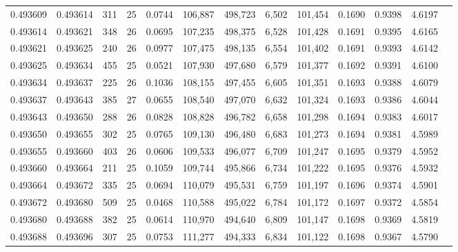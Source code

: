 \begin{tabular}{rrrrrrrrrrrrr}
0.493609 & 0.493614 & 311 &  25 &                                     0.0744 & 106,887 & 498,723 &   6,502 & 101,454 & 0.1690 & 0.9398 & 4.6197 \\
0.493614 & 0.493621 & 348 &  26 &                                     0.0695 & 107,235 & 498,375 &   6,528 & 101,428 & 0.1691 & 0.9395 & 4.6165 \\
0.493621 & 0.493625 & 240 &  26 &                                     0.0977 & 107,475 & 498,135 &   6,554 & 101,402 & 0.1691 & 0.9393 & 4.6142 \\
0.493625 & 0.493634 & 455 &  25 &                                     0.0521 & 107,930 & 497,680 &   6,579 & 101,377 & 0.1692 & 0.9391 & 4.6100 \\
0.493634 & 0.493637 & 225 &  26 &                                     0.1036 & 108,155 & 497,455 &   6,605 & 101,351 & 0.1693 & 0.9388 & 4.6079 \\
0.493637 & 0.493643 & 385 &  27 &                                     0.0655 & 108,540 & 497,070 &   6,632 & 101,324 & 0.1693 & 0.9386 & 4.6044 \\
0.493643 & 0.493650 & 288 &  26 &                                     0.0828 & 108,828 & 496,782 &   6,658 & 101,298 & 0.1694 & 0.9383 & 4.6017 \\
0.493650 & 0.493655 & 302 &  25 &                                     0.0765 & 109,130 & 496,480 &   6,683 & 101,273 & 0.1694 & 0.9381 & 4.5989 \\
0.493655 & 0.493660 & 403 &  26 &                                     0.0606 & 109,533 & 496,077 &   6,709 & 101,247 & 0.1695 & 0.9379 & 4.5952 \\
0.493660 & 0.493664 & 211 &  25 &                                     0.1059 & 109,744 & 495,866 &   6,734 & 101,222 & 0.1695 & 0.9376 & 4.5932 \\
0.493664 & 0.493672 & 335 &  25 &                                     0.0694 & 110,079 & 495,531 &   6,759 & 101,197 & 0.1696 & 0.9374 & 4.5901 \\
0.493672 & 0.493680 & 509 &  25 &                                     0.0468 & 110,588 & 495,022 &   6,784 & 101,172 & 0.1697 & 0.9372 & 4.5854 \\
0.493680 & 0.493688 & 382 &  25 &                                     0.0614 & 110,970 & 494,640 &   6,809 & 101,147 & 0.1698 & 0.9369 & 4.5819 \\
0.493688 & 0.493696 & 307 &  25 &                                     0.0753 & 111,277 & 494,333 &   6,834 & 101,122 & 0.1698 & 0.9367 & 4.5790 \\

\end{tabular}
